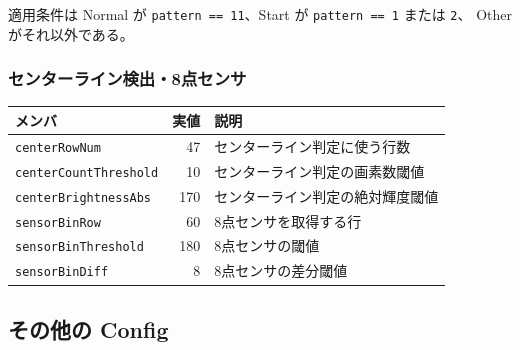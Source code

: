 \documentclass[a4paper,11pt,dvipdfmx]{jsarticle}
\begin{document}
\vspace{2mm}
適用条件は Normal が \texttt{pattern == 11}、Start が \texttt{pattern == 1} または \texttt{2}、
Other がそれ以外である。

\subsubsection{センターライン検出・8点センサ}

\begin{tabularx}{\textwidth}{l r X}
\toprule
\textbf{メンバ} & \textbf{実値} & \textbf{説明} \\
\midrule
\texttt{centerRowNum}         & 47  & センターライン判定に使う行数 \\
\texttt{centerCountThreshold} & 10  & センターライン判定の画素数閾値 \\
\texttt{centerBrightnessAbs}  & 170 & センターライン判定の絶対輝度閾値 \\
\texttt{sensorBinRow}         & 60  & 8点センサを取得する行 \\
\texttt{sensorBinThreshold}   & 180 & 8点センサの閾値 \\
\texttt{sensorBinDiff}        & 8   & 8点センサの差分閾値 \\
\bottomrule
\end{tabularx}

\subsection{その他の Config}\label{sec:params-misc}
\end{document}
